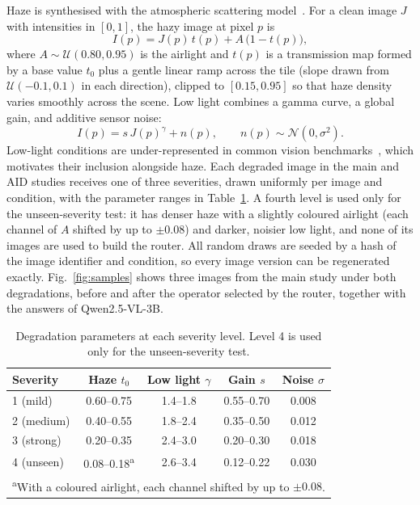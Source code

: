 \documentclass[lettersize,journal]{IEEEtran}
\begin{document}
Haze is synthesised with the atmospheric scattering model~\cite{narasimhan2002vision}. For a clean image $J$ with intensities in $[0,1]$, the hazy image at pixel $p$ is
\begin{equation}
I(p) = J(p)\,t(p) + A\,\big(1 - t(p)\big),
\label{eq:haze}
\end{equation}
where $A \sim \mathcal{U}(0.80, 0.95)$ is the airlight and $t(p)$ is a transmission map formed by a base value $t_0$ plus a gentle linear ramp across the tile (slope drawn from $\mathcal{U}(-0.1, 0.1)$ in each direction), clipped to $[0.15, 0.95]$ so that haze density varies smoothly across the scene. Low light combines a gamma curve, a global gain, and additive sensor noise:
\begin{equation}
I(p) = s\,J(p)^{\gamma} + n(p), \qquad n(p) \sim \mathcal{N}(0, \sigma^{2}).
\label{eq:lowlight}
\end{equation}
Low-light conditions are under-represented in common vision benchmarks~\cite{loh2019exdark}, which motivates their inclusion alongside haze. Each degraded image in the main and AID studies receives one of three severities, drawn uniformly per image and condition, with the parameter ranges in Table~\ref{tab:severity}. A fourth level is used only for the unseen-severity test: it has denser haze with a slightly coloured airlight (each channel of $A$ shifted by up to $\pm0.08$) and darker, noisier low light, and none of its images are used to build the router. All random draws are seeded by a hash of the image identifier and condition, so every image version can be regenerated exactly. Fig.~\ref{fig:samples} shows three images from the main study under both degradations, before and after the operator selected by the router, together with the answers of Qwen2.5-VL-3B.

\begin{table}[t]
\centering
\footnotesize
\caption{Degradation parameters at each severity level. Level 4 is used only for the unseen-severity test.}
\label{tab:severity}
\setlength{\tabcolsep}{3pt}
\begin{tabular}{|l|c|c|c|c|}
\hline
\textbf{Severity} & \textbf{Haze $t_0$} & \textbf{Low light $\gamma$} & \textbf{Gain $s$} & \textbf{Noise $\sigma$} \\
\hline
1 (mild)   & 0.60--0.75 & 1.4--1.8 & 0.55--0.70 & 0.008 \\
2 (medium) & 0.40--0.55 & 1.8--2.4 & 0.35--0.50 & 0.012 \\
3 (strong) & 0.20--0.35 & 2.4--3.0 & 0.20--0.30 & 0.018 \\
\hline
4 (unseen) & 0.08--0.18\textsuperscript{a} & 2.6--3.4 & 0.12--0.22 & 0.030 \\
\hline
\multicolumn{5}{|l|}{\footnotesize \textsuperscript{a}With a coloured airlight, each channel shifted by up to $\pm0.08$.} \\
\hline
\end{tabular}
\end{table}
\end{document}
